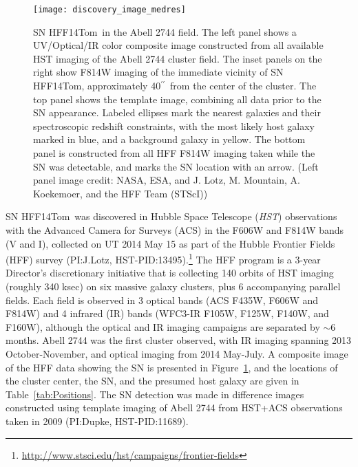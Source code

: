 \documentclass[iop]{emulateapj}
\def\tomas{HFF14Tom}
\def\arcsec{\ensuremath{^{\prime\prime}}}
\def\HST{{\it HST}}
\begin{document}
\begin{figure}
\begin{center}
\texttt{[image: discovery\_image\_medres]}
\caption{  \label{fig:DiscoveryImage} 
SN \tomas\ in the Abell 2744 field.  The left panel shows a
UV/Optical/IR color composite image constructed from all available HST
imaging of the Abell 2744 cluster field.  The inset panels on the right
show F814W imaging of the immediate vicinity of SN \tomas,
approximately 40\arcsec\ from the center of the cluster. The top panel
shows the template image, combining all data prior to the SN
appearance.  Labeled ellipses mark the nearest galaxies and their
spectroscopic redshift constraints, with the most likely host
galaxy marked in blue, and a background galaxy in yellow. The bottom
panel is constructed from all HFF F814W imaging taken while the SN was
detectable, and marks the SN location with an arrow.  (Left panel
image credit: NASA, ESA, and J. Lotz, M. Mountain, A. Koekemoer, and
the HFF Team (STScI)) }
\end{center}
\end{figure}

SN \tomas\ was discovered in Hubble Space Telescope (\HST) observations
with the Advanced Camera for Surveys (ACS) in the F606W and F814W
bands (V and I), collected on UT 2014 May 15 as part of the Hubble
Frontier Fields (HFF) survey (PI:J.Lotz,
HST-PID:13495).\footnote{\url{http://www.stsci.edu/hst/campaigns/frontier-fields}}
The HFF program is a 3-year Director's discretionary initiative that
is collecting 140 orbits of HST imaging (roughly 340 ksec) on six
massive galaxy clusters, plus 6 accompanying parallel fields.  Each
field is observed in 3 optical bands (ACS F435W, F606W and F814W) and
4 infrared (IR) bands (WFC3-IR F105W, F125W, F140W, and F160W),
although the optical and IR imaging campaigns are separated by $\sim$6
months. Abell 2744 was the first cluster observed, with IR imaging
spanning 2013 October-November, and optical imaging from 2014
May-July.  A composite image of the HFF data showing the SN is
presented in Figure~\ref{fig:DiscoveryImage}, and the
locations of the cluster center, the SN, and the presumed host galaxy
are given in Table~\ref{tab:Positions}.  The SN detection was made in
difference images constructed using template imaging of Abell 2744
from HST+ACS observations taken in 2009 (PI:Dupke, HST-PID:11689).


\end{document}
